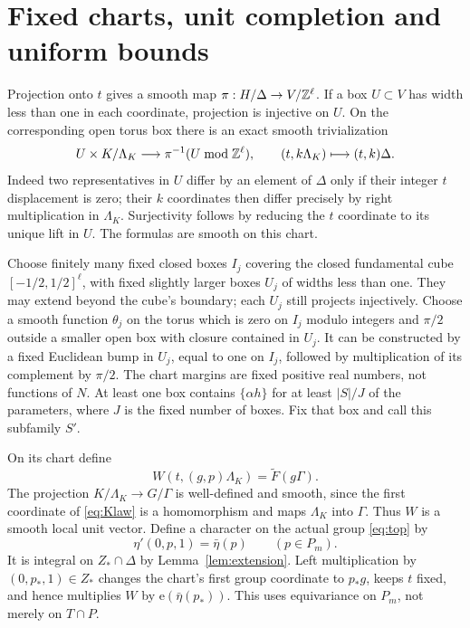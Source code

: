 \documentclass[11pt]{article}
\newcommand{\ee}{\mathrm e}\newcommand{\Lie}{\operatorname{Lie}}
\begin{document}
\section{Fixed charts, unit completion and uniform bounds}
Projection onto $t$ gives a smooth map
$\pi:H/\Delta\to V/\mathbb Z^\ell$. If a box $U\subset V$ has width less
than one in each coordinate, projection is injective on $U$. On the
corresponding open torus box there is an exact smooth trivialization
\begin{equation}\label{eq:chart}
 U\times K/\Lambda_K\longrightarrow\pi^{-1}(U\bmod\mathbb Z^\ell),
 \qquad(t,k\Lambda_K)\longmapsto(t,k)\Delta.
\end{equation}
Indeed two representatives in $U$ differ by an element of $\Delta$
only if their integer $t$ displacement is zero; their $k$ coordinates
then differ precisely by right multiplication in $\Lambda_K$.
Surjectivity follows by reducing the $t$ coordinate to its unique lift
in $U$. The formulas are smooth on this chart.

Choose finitely many fixed closed boxes $I_j$ covering the closed
fundamental cube $[-1/2,1/2]^\ell$, with fixed slightly larger boxes
$U_j$ of widths less than one. They may extend beyond the cube's
boundary; each $U_j$ still projects injectively. Choose a smooth
function $\theta_j$ on the torus which is zero on $I_j$ modulo integers
and $\pi/2$ outside a smaller open box with closure contained in $U_j$.
It can be constructed by a fixed Euclidean bump in $U_j$, equal to one
on $I_j$, followed by multiplication of its complement by $\pi/2$.
The chart margins are fixed positive real numbers, not functions of $N$.
At least one box contains $\{\alpha h\}$ for at least $|S|/J$ of
the parameters, where $J$ is the fixed number of boxes. Fix that box
and call this subfamily $S'$.

On its chart define
\[
 W(t,(g,p)\Lambda_K)=\widetilde F(g\Gamma).
\]
The projection $K/\Lambda_K\to G/\Gamma$ is well-defined and smooth,
since the first coordinate of \eqref{eq:Klaw} is a homomorphism and
maps $\Lambda_K$ into $\Gamma$. Thus $W$ is a smooth local unit
vector. Define a character on the actual group \eqref{eq:top} by
\[
 \eta'(0,p,1)=\bar\eta(p)\qquad(p\in P_m).
\]
It is integral on $Z_*\cap\Delta$ by Lemma~\ref{lem:extension}.
Left multiplication by $(0,p_*,1)\in Z_*$ changes the chart's first
group coordinate to $p_*g$, keeps $t$ fixed, and hence multiplies
$W$ by $\ee(\bar\eta(p_*))$. This uses equivariance on $P_m$,
not merely on $T\cap P$.
\end{document}
